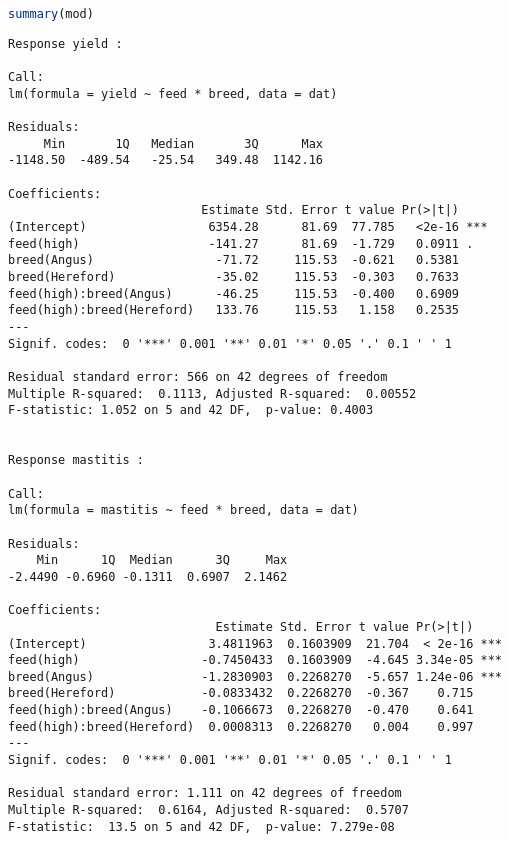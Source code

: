 \begin{lstlisting}[language=R, columns=fullflexible, basicstyle=\linespread{0.85}\small\ttfamily, stringstyle=\color{DarkGreen}, keywordstyle=\color{blue}, commentstyle=\color{DarkGreen},]
summary(mod)
\end{lstlisting}
\begin{Verbatim}[fontsize=\small]
Response yield :

Call:
lm(formula = yield ~ feed * breed, data = dat)

Residuals:
     Min       1Q   Median       3Q      Max
-1148.50  -489.54   -25.54   349.48  1142.16

Coefficients:
                           Estimate Std. Error t value Pr(>|t|)
(Intercept)                 6354.28      81.69  77.785   <2e-16 ***
feed(high)                  -141.27      81.69  -1.729   0.0911 .
breed(Angus)                 -71.72     115.53  -0.621   0.5381
breed(Hereford)              -35.02     115.53  -0.303   0.7633
feed(high):breed(Angus)      -46.25     115.53  -0.400   0.6909
feed(high):breed(Hereford)   133.76     115.53   1.158   0.2535
---
Signif. codes:  0 '***' 0.001 '**' 0.01 '*' 0.05 '.' 0.1 ' ' 1

Residual standard error: 566 on 42 degrees of freedom
Multiple R-squared:  0.1113, Adjusted R-squared:  0.00552
F-statistic: 1.052 on 5 and 42 DF,  p-value: 0.4003


Response mastitis :

Call:
lm(formula = mastitis ~ feed * breed, data = dat)

Residuals:
    Min      1Q  Median      3Q     Max
-2.4490 -0.6960 -0.1311  0.6907  2.1462

Coefficients:
                             Estimate Std. Error t value Pr(>|t|)
(Intercept)                 3.4811963  0.1603909  21.704  < 2e-16 ***
feed(high)                 -0.7450433  0.1603909  -4.645 3.34e-05 ***
breed(Angus)               -1.2830903  0.2268270  -5.657 1.24e-06 ***
breed(Hereford)            -0.0833432  0.2268270  -0.367    0.715
feed(high):breed(Angus)    -0.1066673  0.2268270  -0.470    0.641
feed(high):breed(Hereford)  0.0008313  0.2268270   0.004    0.997
---
Signif. codes:  0 '***' 0.001 '**' 0.01 '*' 0.05 '.' 0.1 ' ' 1

Residual standard error: 1.111 on 42 degrees of freedom
Multiple R-squared:  0.6164, Adjusted R-squared:  0.5707
F-statistic:  13.5 on 5 and 42 DF,  p-value: 7.279e-08
\end{Verbatim}
